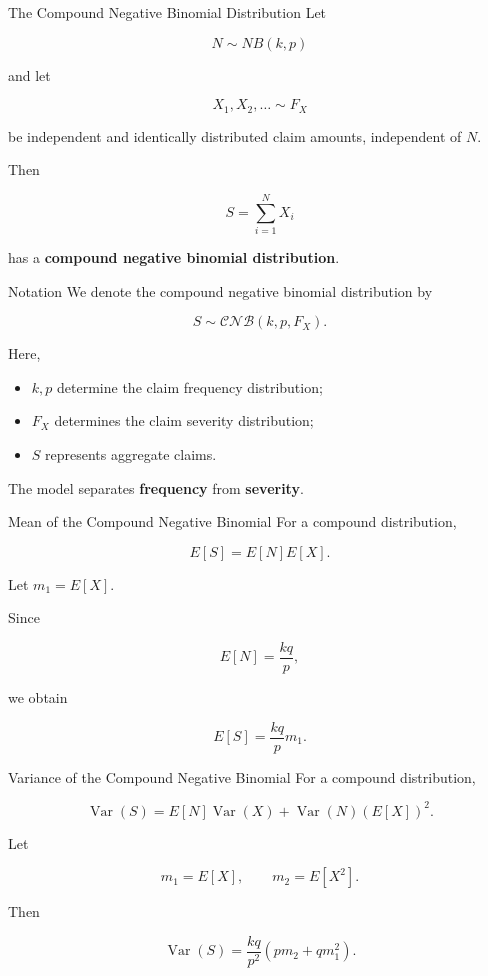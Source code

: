 \documentclass[
  ignorenonframetext,
  aspectratio=169,
]{beamer}
\providecommand{\tightlist}{%
  \setlength{\itemsep}{0pt}\setlength{\parskip}{0pt}}
\begin{document}
\begin{frame}{The Compound Negative Binomial Distribution}
\protect{}\label{the-compound-negative-binomial-distribution}
Let

\[
N\sim NB(k,p)
\]

and let

\[
X_1,X_2,\ldots\sim F_X
\]

be independent and identically distributed claim amounts, independent of
\(N\).

Then

\[
S=\sum_{i=1}^{N}X_i
\]

has a \textbf{compound negative binomial distribution}.
\end{frame}

\begin{frame}{Notation}
\protect{}\label{notation}
We denote the compound negative binomial distribution by

\[
S\sim\mathcal{CNB}(k,p,F_X).
\]

Here,

\begin{itemize}
\tightlist
\item
  \(k,p\) determine the claim frequency distribution;
\item
  \(F_X\) determines the claim severity distribution;
\item
  \(S\) represents aggregate claims.
\end{itemize}

The model separates \textbf{frequency} from \textbf{severity}.
\end{frame}

\begin{frame}{Mean of the Compound Negative Binomial}
\protect{}\label{mean-of-the-compound-negative-binomial}
For a compound distribution,

\[
E[S]=E[N]E[X].
\]

Let \(m_1=E[X].\)

Since

\[
E[N]=\frac{kq}{p},
\]

we obtain

\[
\boxed{E[S]=\frac{kq}{p}m_1}.
\]
\end{frame}

\begin{frame}{Variance of the Compound Negative Binomial}
\protect{}\label{variance-of-the-compound-negative-binomial}
For a compound distribution,

\[
\operatorname{Var}(S)
=
E[N]\operatorname{Var}(X)
+
\operatorname{Var}(N)(E[X])^2.
\]

Let

\[
m_1=E[X],
\qquad
m_2=E[X^2].
\]

Then

\[
\boxed{
\operatorname{Var}(S)
=
\frac{kq}{p^2}
\left(pm_2+qm_1^2\right)
}.
\]
\end{frame}
\end{document}
